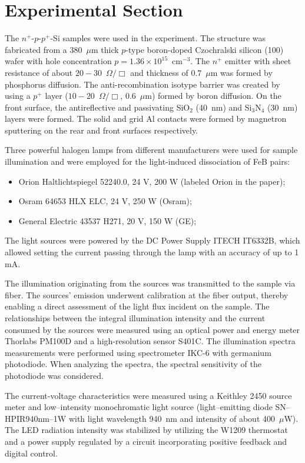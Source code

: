 \documentclass{WileyMSP-template}
\begin{document}

\section{Experimental Section}
\label{SecExp}

The $n^+$-$p$-$p^+$-Si samples were used in the experiment.
The structure was fabricated from a 380~$\mu$m thick $p$-type boron-doped
Czochralski silicon (100) wafer with hole concentration $p=1.36\times10^{15}$~cm$^{-3}$.
The $n^+$ emitter with sheet resistance of about $20-30$~$\Omega/\Box$
and  thickness of $0.7$~$\mu$m was formed by phosphorus diffusion.
The anti-recombination isotype barrier was created by using a $p^+$
layer ($10-20$~$\Omega/\Box$, $0.6$~$\mu$m) formed by boron diffusion.
On the front surface, the antireflective and passivating SiO$_2$ (40~nm) and Si$_3$N$_4$ (30~nm) layers
were formed.
The solid and grid Al contacts were formed by magnetron sputtering on the rear and front surfaces respectively.

Three powerful halogen lamps from different manufacturers were used for sample illumination and were employed for the light-induced dissociation of FeB pairs:
\begin{itemize}
  \item Orion Haltlichtspiegel 52240.0, 24 V, 200 W (labeled Orion in the paper);
  \item Osram 64653 HLX ELC, 24 V, 250 W (Osram);
  \item General Electric 43537 H271, 20 V, 150 W (GE);
\end{itemize}
The light sources were powered by the DC Power Supply ITECH IT6332B, which allowed setting the current passing through the lamp with an accuracy of up to 1 mA.

The illumination originating from the sources was transmitted to the sample via fiber.
The sources' emission underwent calibration at the fiber output,
thereby enabling a direct assessment of the light flux incident on the sample.
The relationships between the integral illumination intensity
and the current consumed by the sources were measured using an optical power and energy meter Thorlabs PM100D and a high-resolution sensor S401C.
The illumination spectra measurements were performed using spectrometer IKC-6 with germanium photodiode.
When analyzing the spectra, the spectral sensitivity of the photodiode was considered.

The current-voltage characteristics were measured using a Keithley 2450 source meter and
low--intensity monochromatic light source (light--emitting diode SN--HPIR940nm--1W with light wavelength 940~nm and intensity of about 400~$\mu$W).
The LED radiation intensity was stabilized by utilizing the W1209 thermostat and a power supply regulated by a circuit incorporating positive feedback and digital control.
\end{document}
